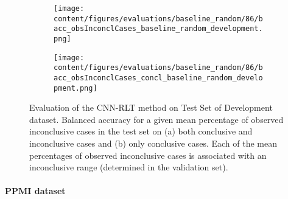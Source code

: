 \begin{figure}[ht]
  \begin{subfigure}{0.9\textwidth}
    \centering
    \texttt{[image: content/figures/evaluations/baseline\_random/86/bacc\_obsInconclCases\_baseline\_random\_development.png]}
    \subcaption{}
    \label{fig:bacc_obsInconclCases_baseline_random_development}
  \end{subfigure}
  \hfill
  \begin{subfigure}{0.9\textwidth}
    \centering
    \texttt{[image: content/figures/evaluations/baseline\_random/86/bacc\_obsInconclCases\_concl\_baseline\_random\_development.png]}
    \subcaption{}
    \label{fig:bacc_obsInconclCases_concl_baseline_random_development}
  \end{subfigure}

  \caption{Evaluation of the CNN-RLT method on Test Set of Development dataset.
  Balanced accuracy for a given mean percentage of observed inconclusive cases in the test set on 
  (a) both conclusive and inconclusive cases and (b) only conclusive cases. 
  Each of the mean percentages of observed inconclusive cases is associated with an inconclusive range (determined in the validation set). }
  \label{fig:bacc_obsInconclCases_baseline_random_development_full}
\end{figure}





\paragraph{PPMI dataset}

